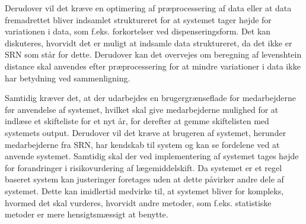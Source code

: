 Derudover vil det kræve en optimering af præprocessering af data eller at data fremadrettet bliver indsamlet struktureret for at systemet tager højde for variationen i data, som f.eks. forkortelser ved dispenseringsform. Det kan diskuteres, hvorvidt det er muligt at indsamle data struktureret, da det ikke er SRN som står for dette. Derudover kan det overvejes om beregning af levenshtein distance skal anvendes efter præprocessering for at mindre variationer i data ikke har betydning ved sammenligning. 

Samtidig kræver det, at der udarbejdes en brugergrænseflade for medarbejderne før anvendelse af systemet, hvilket skal give medarbejderne mulighed for at indlæse et skifteliste for et nyt år, for derefter at gemme skiftelisten med systemets output. Derudover vil det kræve at brugeren af systemet, herunder medarbejderne fra SRN, har kendskab til system og kan se fordelene ved at anvende systemet. Samtidig skal der ved implementering af systemet tages højde for forandringer i risikovurdering af lægemiddelskift. Da  systemet er et regel baseret system kan justeringer foretages uden at dette påvirker andre dele af systemet. Dette kan imidlertid medvirke til, at systemet bliver for kompleks, hvormed det skal vurderes, hvorvidt andre metoder, som f.eks. statistiske metoder er mere hensigtsmæssigt at benytte.





